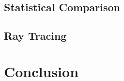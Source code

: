 \documentclass[preprint,12pt,3p]{elsarticle}
\begin{document}
\subsection{Statistical Comparison}
 
\subsection{Ray Tracing}

\section{Conclusion}




% 
% 
% 
% 
% 
% 
% 
% 
% 
% 
% 
% 


\end{document}

